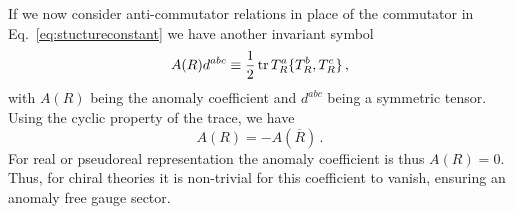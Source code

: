 If we now consider anti-commutator relations in place of the commutator in Eq.~\eqref{eq:stuctureconstant} we have another invariant symbol 
\begin{equation}
    A(R)d^{abc}\equiv \frac 12 \operatorname{tr}{T^a_R\{T^b_R,T^c_R\}}\,,
\end{equation}
with $A(R)$ being the anomaly coefficient \cite{srednicki2006qft} and $d^{abc}$ being a symmetric tensor. Using the cyclic property of the trace, we have
\begin{equation}
    A(R)=-A(\overline R)\,.
    \label{eq:anomaly coefficient}
\end{equation}
For real or pseudoreal representation the anomaly coefficient is thus $A(R)=0$. Thus, for chiral theories it is non-trivial for this coefficient to vanish, ensuring an anomaly free gauge sector.


